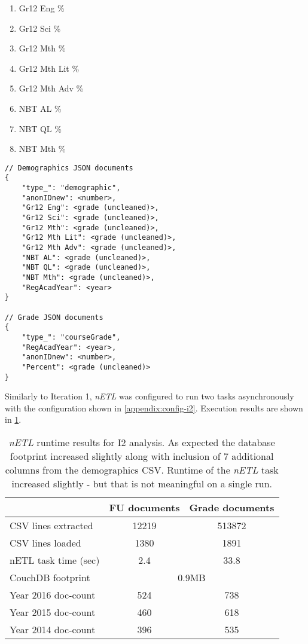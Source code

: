 \begin{enumerate}
    \item Gr12 Eng \%
    \item Gr12 Sci \%
    \item Gr12 Mth \%
    \item Gr12 Mth Lit \%
    \item Gr12 Mth Adv \%
    \item NBT AL \%
    \item NBT QL \%
    \item NBT Mth \%
\end{enumerate}

\begin{verbatim}
// Demographics JSON documents
{
    "type_": "demographic",
    "anonIDnew": <number>,
    "Gr12 Eng": <grade (uncleaned)>,
    "Gr12 Sci": <grade (uncleaned)>,
    "Gr12 Mth": <grade (uncleaned)>,
    "Gr12 Mth Lit": <grade (uncleaned)>,
    "Gr12 Mth Adv": <grade (uncleaned)>,
    "NBT AL": <grade (uncleaned)>,
    "NBT QL": <grade (uncleaned)>,
    "NBT Mth": <grade (uncleaned)>,
    "RegAcadYear": <year>
}

// Grade JSON documents
{
    "type_": "courseGrade",
    "RegAcadYear": <year>,
    "anonIDnew": <number>,
    "Percent": <grade (uncleaned)>
}
\end{verbatim}

Similarly to Iteration 1, \textit{nETL} was configured to run two tasks asynchronously with the configuration shown in \ref{appendix:config-i2}. Execution results are shown in \ref{i2-results}.

\begin{table}[]
    \centering
    \caption{\textit{nETL} runtime results for I2 analysis. As expected the database footprint increased slightly along with inclusion of 7 additional columns from the demographics CSV. Runtime of the \textit{nETL} task increased slightly - but that is not meaningful on a single run.}
    \label{i2-results}
    \begin{tabular}{lcc}
                             & FU documents              & Grade documents \\ \hline
        CSV lines extracted  & 12219                     & 513872          \\
        CSV lines loaded     & 1380                      & 1891            \\
        nETL task time (sec) & 2.4                       & 33.8            \\
        CouchDB footprint    & \multicolumn{2}{c}{0.9MB}                   \\
        Year 2016 doc-count  & 524                       & 738             \\
        Year 2015 doc-count  & 460                       & 618             \\
        Year 2014 doc-count  & 396                       & 535             \\
    \end{tabular}
\end{table}


